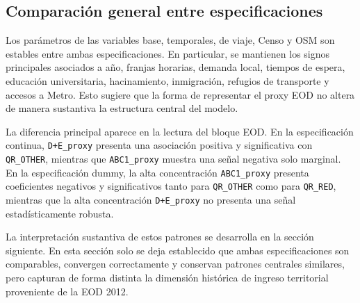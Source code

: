 \begin{landscape}
\begin{longtable}{p{0.27\linewidth}rrrrrr}
\end{longtable}
\end{landscape}

\subsection{Comparación general entre especificaciones}

Los parámetros de las variables base, temporales, de viaje, Censo y OSM son estables entre ambas
especificaciones. En particular, se mantienen los signos principales asociados a año, franjas
horarias, demanda local, tiempos de espera, educación universitaria, hacinamiento, inmigración,
refugios de transporte y accesos a Metro. Esto sugiere que la forma de representar el proxy EOD no
altera de manera sustantiva la estructura central del modelo.

La diferencia principal aparece en la lectura del bloque EOD. En la especificación continua,
\texttt{D+E\_proxy} presenta una asociación positiva y significativa con \texttt{QR\_OTHER}, mientras
que \texttt{ABC1\_proxy} muestra una señal negativa solo marginal. En la especificación dummy, la
alta concentración \texttt{ABC1\_proxy} presenta coeficientes negativos y significativos tanto para
\texttt{QR\_OTHER} como para \texttt{QR\_RED}, mientras que la alta concentración
\texttt{D+E\_proxy} no presenta una señal estadísticamente robusta.

La interpretación sustantiva de estos patrones se desarrolla en la sección siguiente. En esta sección
solo se deja establecido que ambas especificaciones son comparables, convergen correctamente y
conservan patrones centrales similares, pero capturan de forma distinta la dimensión histórica de
ingreso territorial proveniente de la EOD 2012.
